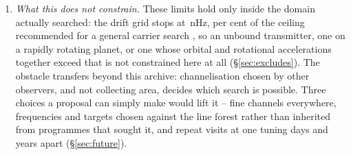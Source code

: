 \begin{enumerate}[leftmargin=1.6em,itemsep=4pt,topsep=4pt,parsep=0pt]
\item \emph{What this does not constrain.} These limits hold only inside the
domain actually searched: the drift grid stops at \DriftCeilLo\,nHz,
\AccelSheikhPct{} per cent of the ceiling recommended for a general carrier
search \citep{Sheikh2019}, so an unbound transmitter, one on a rapidly rotating
planet, or one whose orbital and rotational accelerations together exceed that
is not constrained here at all (\S\ref{sec:excludes}). The obstacle transfers
beyond this archive: channelisation chosen by other observers, and not
collecting area, decides which search is possible. Three choices a proposal can
simply make would lift it -- fine channels everywhere, frequencies and targets
chosen against the line forest rather than inherited from programmes that
sought it, and repeat visits at one tuning days and years apart
(\S\ref{sec:future}).

\end{enumerate}

